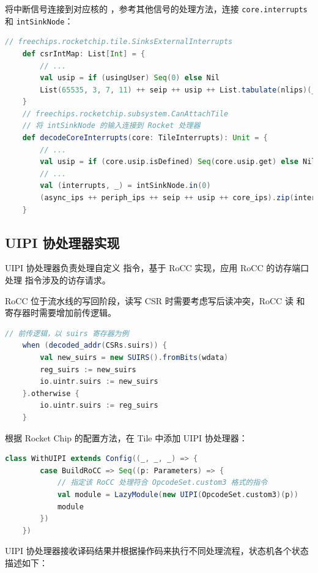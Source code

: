 将中断信号连接到对应核的 \FcsrUipUsip ，参考其他信号的处理方法，连接 \texttt{core.interrupts} 和 \texttt{intSinkNode}：

\begin{lstlisting}[style=CStyle,language=scala]
    // freechips.rocketchip.tile.SinksExternalInterrupts
    def csrIntMap: List[Int] = {
        // ...
        val usip = if (usingUser) Seq(0) else Nil
        List(65535, 3, 7, 11) ++ seip ++ usip ++ List.tabulate(nlips)(_ + 16)
    }
    // freechips.rocketchip.subsystem.CanAttachTile
    // 将 intSinkNode 的输入连接到 Rocket 处理器
    def decodeCoreInterrupts(core: TileInterrupts): Unit = {
        // ...
        val usip = if (core.usip.isDefined) Seq(core.usip.get) else Nil
        // ...
        val (interrupts, _) = intSinkNode.in(0)
        (async_ips ++ periph_ips ++ seip ++ usip ++ core_ips).zip(interrupts).foreach { case(c, i) => c := i }
    }
\end{lstlisting}

\subsection{UIPI 协处理器实现}

UIPI 协处理器负责处理自定义 \Iuipi 指令，基于 RoCC 实现，应用 RoCC 的访存端口处理 \Iuipi 指令涉及的访存请求。

RoCC 位于流水线的写回阶段，读写 CSR 时需要考虑写后读冲突，RoCC 读 \Rsuirs 和 \Rsuist 寄存器时需要增加前传逻辑。

\begin{lstlisting}[style=CStyle,language=scala]
    // 前传逻辑，以 suirs 寄存器为例
    when (decoded_addr(CSRs.suirs)) {
        val new_suirs = new SUIRS().fromBits(wdata)
        reg_suirs := new_suirs
        io.uintr.suirs := new_suirs
    }.otherwise {
        io.uintr.suirs := reg_suirs
    }
\end{lstlisting}

根据 Rocket Chip 的配置方法，在 Tile 中添加 UIPI 协处理器：

\begin{lstlisting}[style=CStyle,language=scala]
    class WithUIPI extends Config((_, _, _) => {
        case BuildRoCC => Seq((p: Parameters) => {
            // 指定该 RoCC 处理符合 OpcodeSet.custom3 格式的指令
            val module = LazyModule(new UIPI(OpcodeSet.custom3)(p))
            module
        })
    })
\end{lstlisting}

UIPI 协处理器接收译码结果并根据操作码来执行不同处理流程，状态机各个状态描述如下：

